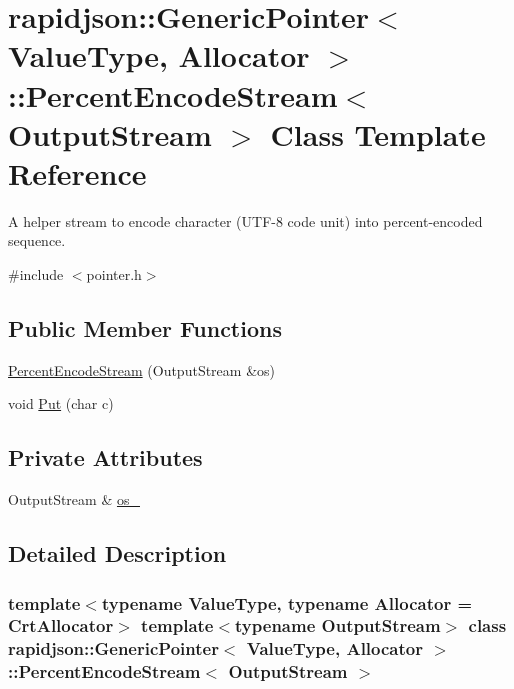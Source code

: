 \hypertarget{classrapidjson_1_1_generic_pointer_1_1_percent_encode_stream}{}\section{rapidjson\+::Generic\+Pointer$<$ Value\+Type, Allocator $>$\+::Percent\+Encode\+Stream$<$ Output\+Stream $>$ Class Template Reference}
\label{classrapidjson_1_1_generic_pointer_1_1_percent_encode_stream}


A helper stream to encode character (U\+T\+F-\/8 code unit) into percent-\/encoded sequence.  




{\ttfamily \#include $<$pointer.\+h$>$}

\subsection*{Public Member Functions}
\begin{DoxyCompactItemize}
\item 
\mbox{\hyperlink{classrapidjson_1_1_generic_pointer_1_1_percent_encode_stream_a0f6b987045d96e83d6daf5f675588a2e}{Percent\+Encode\+Stream}} (Output\+Stream \&os)
\item 
void \mbox{\hyperlink{classrapidjson_1_1_generic_pointer_1_1_percent_encode_stream_af3a6e9027fa1ce50198aa97e3f102523}{Put}} (char c)
\end{DoxyCompactItemize}
\subsection*{Private Attributes}
\begin{DoxyCompactItemize}
\item 
Output\+Stream \& \mbox{\hyperlink{classrapidjson_1_1_generic_pointer_1_1_percent_encode_stream_a83bfa0776440f9fc090afb99f5da9516}{os\+\_\+}}
\end{DoxyCompactItemize}


\subsection{Detailed Description}
\subsubsection*{template$<$typename Value\+Type, typename Allocator = Crt\+Allocator$>$\newline
template$<$typename Output\+Stream$>$\newline
class rapidjson\+::\+Generic\+Pointer$<$ Value\+Type, Allocator $>$\+::\+Percent\+Encode\+Stream$<$ Output\+Stream $>$}

